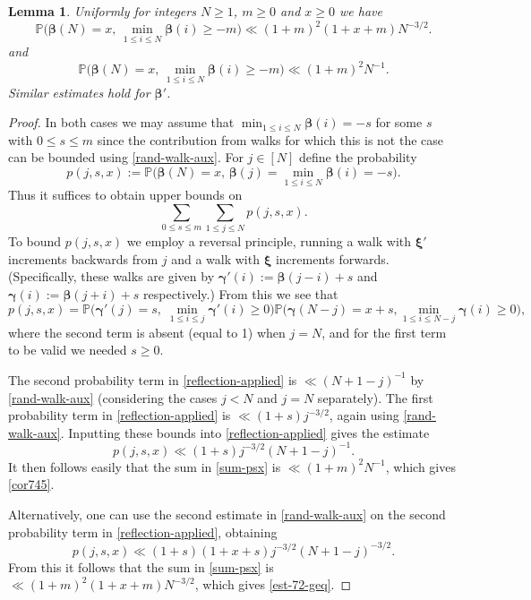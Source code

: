 \documentclass[11pt,reqno]{amsart}
\numberwithin{equation}{section}
\newtheorem{lemma}[theorem]{Lemma}
\theoremstyle{definition}
\theoremstyle{remark}
\newcommand{\mb}{\mathbb}
\def\boldbeta{\boldsymbol\beta}
\def\boldgamma{\boldsymbol\gamma}
\def\boldxi{\boldsymbol\xi}
\renewcommand{\le}{\leqslant}
\renewcommand{\ge}{\geqslant}
\begin{document}
\begin{lemma}
Uniformly for integers $N \ge 1$, $m \ge 0$ and $x \ge 0$ we have
\begin{equation}\label{est-72-geq} \mb{P}\big(\boldbeta(N) = x,\, \min_{1 \le i \le N} \boldbeta(i) \ge -m\big) \ll (1 + m)^2(1 + x+ m) N^{-3/2}.\end{equation}
and
\begin{equation}\label{cor745} \mb{P}\big( \boldbeta(N) = x, \, \min_{1 \le i \le N} \boldbeta(i) \ge -m\big) \ll (1 + m)^2 N^{-1}.\end{equation}
Similar estimates hold for $\boldbeta'$.
\end{lemma}
\begin{proof}
In both cases we may assume that $\min_{1 \le i \le N} \boldbeta(i) = -s$ for some $s$ with $0 \le s \le m$ since the contribution from walks for which this is not the case can be bounded using \cref{rand-walk-aux}. For $j \in [N]$ define the probability
\[ p(j,s,x) := \mb{P}\big( \boldbeta(N) = x,\, \boldbeta(j) = \min_{1 \le i \le N} \boldbeta(i)  = -s\big).\] Thus it suffices to obtain upper bounds on 
\begin{equation}\label{sum-psx} \sum_{0 \le s \le m}\sum_{1 \le j \le N} p(j,s,x).\end{equation}
To bound $p(j,s,x)$ we employ a reversal principle, running a walk with $\boldxi'$ increments backwards from $j$ and a walk with $\boldxi$ increments forwards. (Specifically, these walks are given by $\boldgamma'(i) := \boldbeta(j - i) + s$ and $\boldgamma(i) := \boldbeta(j + i) + s$ respectively.) From this we see that 
\begin{equation}\label{reflection-applied} p(j,s,x) =  \mb{P}\big(\boldgamma'(j) = s, \;\min_{1 \le i \le j} \boldgamma'(i) \ge 0\big) \mb{P}\big(\boldgamma(N - j) = x+ s, \min_{1 \le i \le N - j} \boldgamma(i) \ge 0\big),\end{equation} where the second term is absent (equal to 1) when $j = N$, and for the first term to be valid we needed $s \ge 0$.

The second probability term in \cref{reflection-applied} is $\ll (N + 1 - j)^{-1}$ by \cref{rand-walk-aux} (considering the cases $j < N$ and $j = N$ separately). The first probability term in \cref{reflection-applied} is $\ll (1 + s) j^{-3/2}$, again using \cref{rand-walk-aux}. Inputting these bounds into \cref{reflection-applied} gives the estimate
\begin{equation}\label{argim-each-x} p(j,s,x) \ll (1 + s) j^{-3/2} (N + 1 - j)^{-1}.\end{equation} 
It then follows easily that the sum in \cref{sum-psx} is $\ll(1 + m)^2 N^{-1}$, which gives \cref{cor745}.

Alternatively, one can use the second estimate in \cref{rand-walk-aux} on the second probability term in \cref{reflection-applied}, obtaining
\begin{equation*} p(j,s,x) \ll (1 + s)  (1 + x + s) j^{-3/2}(N + 1 - j)^{-3/2}.\end{equation*} 
From this it follows that the sum in \cref{sum-psx} is $\ll (1 + m)^2 (1 + x + m) N^{-3/2}$, which gives \cref{est-72-geq}.
\end{proof}
\end{document}
